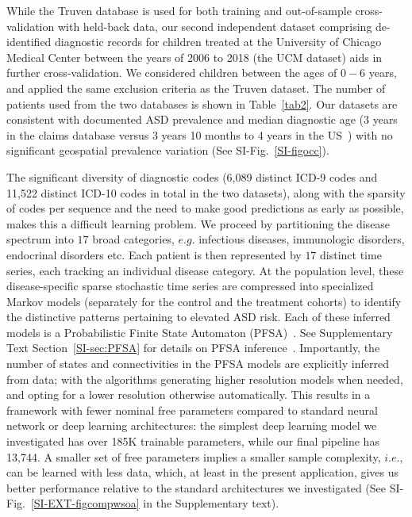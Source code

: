 \documentclass[onecolumn,10pt]{IEEEtran}
\begin{document}
While the Truven database is used for both training and out-of-sample cross-validation with held-back  data, our second independent dataset  comprising de-identified diagnostic records for children treated at the University of Chicago Medical Center between the years of 2006 to 2018 (the UCM dataset) aids in further cross-validation. We considered children between the ages of $0-6$ years, and  applied the same exclusion criteria as the Truven dataset.  The  number of  patients used from the two databases is shown in Table~\ref{tab2}. Our datasets are consistent with documented ASD prevalence and median diagnostic age (3 years in the claims database  versus 3 years 10 months to 4 years  in the US~\cite{pmid29701730}) with no significant geospatial prevalence variation (See SI-Fig.~\ref{SI-figocc}).

The significant diversity of diagnostic codes (6,089 distinct ICD-9 codes and 11,522 distinct ICD-10 codes in total in the two datasets), along with the sparsity of codes per sequence and the need to make good predictions as early as possible,  makes this a difficult learning problem.  We proceed by  partitioning the  disease spectrum into $17 $ broad categories, $e.g.$ infectious diseases, immunologic disorders, endocrinal disorders etc. Each patient is then represented by $17$ distinct time series, each  tracking an individual disease category. At the population level, these disease-specific sparse stochastic time series are  compressed into specialized Markov models (separately for the control and the treatment cohorts) to identify  the distinctive patterns  pertaining to elevated ASD risk. Each of these inferred models is a Probabilistic Finite State Automaton (PFSA)~\cite{CR08}. See Supplementary Text Section~\ref{SI-sec:PFSA} for details on PFSA inference~\cite{CL12g,Chattopadhyay20140826}.  Importantly, the number of states and connectivities in the PFSA models are explicitly inferred from data; with the algorithms generating higher resolution models when needed, and opting for a lower resolution otherwise automatically. This results in a framework with fewer nominal free parameters compared to standard neural network or deep learning architectures: the simplest deep learning model we investigated has over 185K trainable parameters, while our final pipeline has 13,744. A smaller set of free parameters implies a smaller sample complexity, $i.e.$, can be learned with less data, which, at least in the present application, gives us better performance relative to the standard architectures we investigated (See SI-Fig.~\ref{SI-EXT-figcompwsoa} in the Supplementary text).
\end{document}
